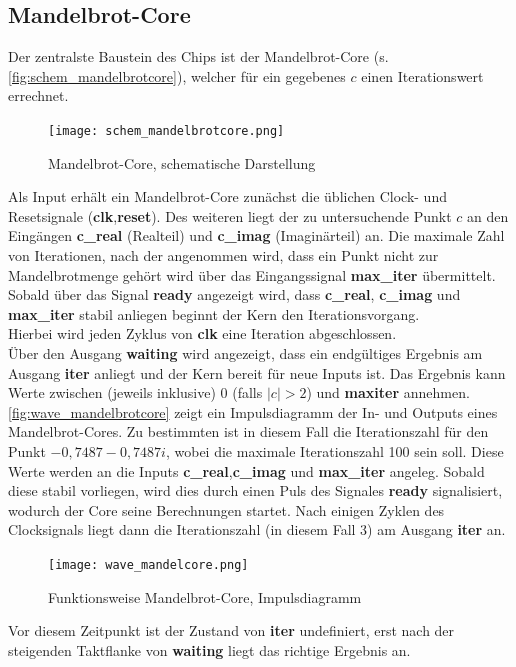 \documentclass[a4paper,12pt,onesided]{report}
\begin{document}
\subsection{Mandelbrot-Core}
Der zentralste Baustein des Chips ist der Mandelbrot-Core (s. \autoref{fig:schem_mandelbrotcore}), welcher für ein gegebenes $c$ einen Iterationswert errechnet.
\begin{figure}[H]
	\centering
	\texttt{[image: schem\_mandelbrotcore.png]}
	\caption{Mandelbrot-Core, schematische Darstellung}
	\label{fig:schem_mandelbrotcore}
\end{figure}
Als Input erhält ein Mandelbrot-Core zunächst die üblichen Clock- und Resetsignale (\textbf{clk},\textbf{reset}).
Des weiteren liegt der zu untersuchende Punkt $c$ an den Eingängen \textbf{c\_real} (Realteil) und \textbf{c\_imag} (Imaginärteil) an.
Die maximale Zahl von Iterationen, nach der angenommen wird, dass ein Punkt nicht zur Mandelbrotmenge gehört wird über das Eingangssignal \textbf{max\_iter} übermittelt.\\
Sobald über das Signal \textbf{ready} angezeigt wird, dass \textbf{c\_real}, \textbf{c\_imag} und \textbf{max\_iter} stabil anliegen beginnt der Kern den Iterationsvorgang.\\
Hierbei wird jeden Zyklus von \textbf{clk} eine Iteration abgeschlossen.\\
Über den Ausgang \textbf{waiting} wird angezeigt, dass ein endgültiges Ergebnis am Ausgang \textbf{iter} anliegt und der Kern bereit für neue Inputs ist.
Das Ergebnis kann Werte zwischen (jeweils inklusive) 0 (falls $|c|>2$) und \textbf{maxiter} annehmen.\\
\autoref{fig:wave_mandelbrotcore} zeigt ein Impulsdiagramm der In- und Outputs eines Mandelbrot-Cores.
Zu bestimmten ist in diesem Fall die Iterationszahl für den Punkt $-0,7487-0,7487i$, wobei die maximale Iterationszahl 100 sein soll.
Diese Werte werden an die Inputs \textbf{c\_real},\textbf{c\_imag} und \textbf{max\_iter} angeleg.
Sobald diese stabil vorliegen, wird dies durch einen Puls des Signales \textbf{ready} signalisiert, wodurch der Core seine Berechnungen startet.
Nach einigen Zyklen des Clocksignals liegt dann die Iterationszahl (in diesem Fall 3) am Ausgang \textbf{iter} an.
\begin{figure}[H]
	\centering
	\texttt{[image: wave\_mandelcore.png]}
	\caption{Funktionsweise Mandelbrot-Core, Impulsdiagramm}
	\label{fig:wave_mandelbrotcore}
\end{figure}
Vor diesem Zeitpunkt ist der Zustand von \textbf{iter} undefiniert, erst nach der steigenden Taktflanke von \textbf{waiting} liegt das richtige Ergebnis an.
\end{document}
